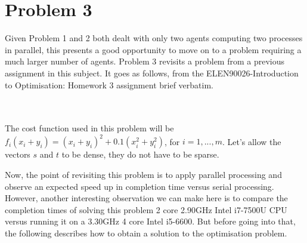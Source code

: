 \documentclass[12pt]{article}
\begin{document}
\section*{Problem 3}

Given Problem 1 and 2 both dealt with only two agents computing two processes in parallel, this presents a good opportunity to move on to a problem requiring a much larger number of agents. Problem 3 revisits a problem from a previous assignment in this subject. It goes as follows, from the ELEN90026-Introduction to Optimisation: Homework 3 assignment brief verbatim.

\noindent{}\\\\

The cost function used in this problem will be $f_i(x_i+y_i)=(x_i+y_i)^2+0.1(x_i^2+y_i^2)$, for $i=1,...,m$. Let's allow the vectors $s$ and $t$ to be dense, they do not have to be sparse.

Now, the point of revisiting this problem is to apply parallel processing and observe an expected speed up in completion time versus serial processing. However, another interesting observation we can make here is to compare the completion times of solving this problem 2 core 2.90GHz Intel i7-7500U CPU versus running it on a 3.30GHz 4 core Intel i5-6600. But before going into that, the following describes how to obtain a solution to the optimisation problem.
\end{document}
